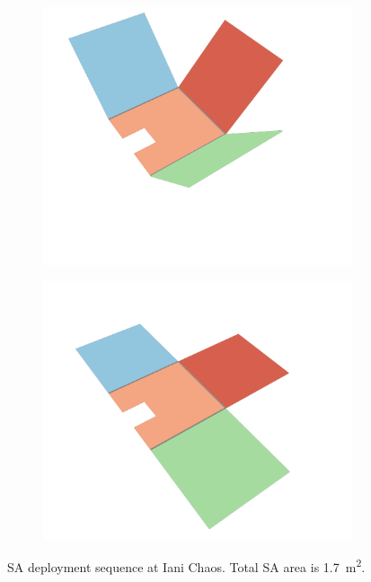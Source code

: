 \begin{figure}[h]
\begin{subfigure}[t]{\subfigureWidth}
		\includegraphics[height=\graphicsHeight]{sections/power-system-design/solar-array/images/deployment/iani-chaos/solar_array_deployment_iani_chaos_030.png}
		\label{fig:sub:deployment-sequence-iani-chaos-mid}
	\end{subfigure}\hfill
    \begin{subfigure}[t]{\subfigureWidth}
        \centering
		\includegraphics[height=\graphicsHeight]{sections/power-system-design/solar-array/images/deployment/iani-chaos/solar_array_deployment_iani_chaos_060.png}
		\label{fig:sub:deployment-sequence-iani-completed}
	\end{subfigure}
	\caption[Solar array deployment sequence at Iani Chaos]
    {\ac{SA} deployment sequence at Iani Chaos. Total \ac{SA} area is \SI{1.7}{\meter\squared}.}
	\label{fig:deployment-sequence-iani-chaos}
\vspace{-2ex}
\end{figure}

